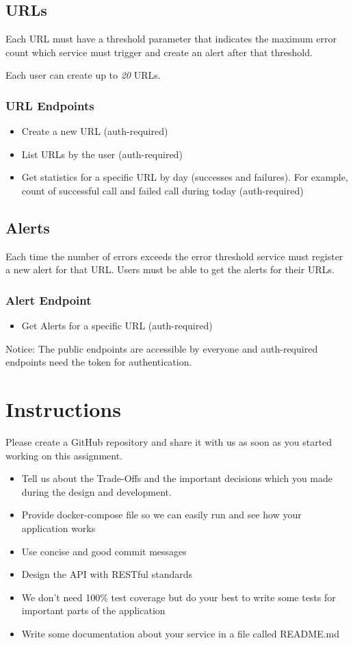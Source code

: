 \documentclass{article}
\begin{document}
\subsection{URLs}
Each URL must have a threshold parameter that indicates the maximum error count which service must trigger and create an alert after that threshold.

Each user can create up to \textit{20} URLs.

\subsubsection{URL Endpoints}
\begin{itemize}
  \item Create a new URL (auth-required)
  \item List URLs by the user (auth-required)
  \item Get statistics for a specific URL by day (successes and failures). For example, count of successful call and failed call during today (auth-required)
\end{itemize}

\subsection{Alerts}
Each time the number of errors exceeds the error threshold service must register a new alert for that URL.
Users must be able to get the alerts for their URLs.

\subsubsection{Alert Endpoint}
\begin{itemize}
  \item Get Alerts for a specific URL (auth-required)
\end{itemize}


Notice: The public endpoints are accessible by everyone and auth-required endpoints need the token for authentication.

\section{Instructions}

Please create a GitHub repository and share it with us as soon as you started working on this assignment.

\begin{itemize}
  \item Tell us about the Trade-Offs and the important decisions which you made during the design and development.
  \item Provide docker-compose file so we can easily run and see how your application works
  \item Use concise and good commit messages
  \item Design the API with RESTful standards
  \item We don’t need 100\% test coverage but do your best to write some tests for important parts of the application
  \item Write some documentation about your service in a file called README.md
\end{itemize}
\end{document}
